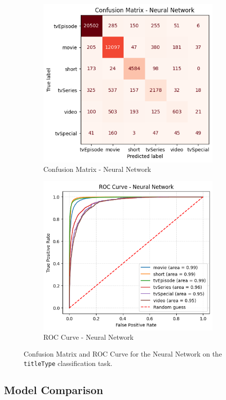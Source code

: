 
\begin{figure}[H]
    \centering
    \begin{subfigure}[b]{0.47\textwidth}
        \centering
        \includegraphics[width=\textwidth]{plotsss/cm_nn_titletype.png}
        \caption{Confusion Matrix - Neural Network}
        \label{fig:cm_nn_titletype}
    \end{subfigure}
    \hfill
    \begin{subfigure}[b]{0.50\textwidth}
        \centering
        \includegraphics[width=\textwidth]{plotsss/roc_nn_titletype.png}
        \caption{ROC Curve - Neural Network}
        \label{fig:roc_nn_titletype}
    \end{subfigure}
    \caption{Confusion Matrix and ROC Curve for the Neural Network on the \texttt{titleType} classification task.}
    \label{fig:cm_nn_titletype}
\end{figure}




\subsection{Model Comparison}